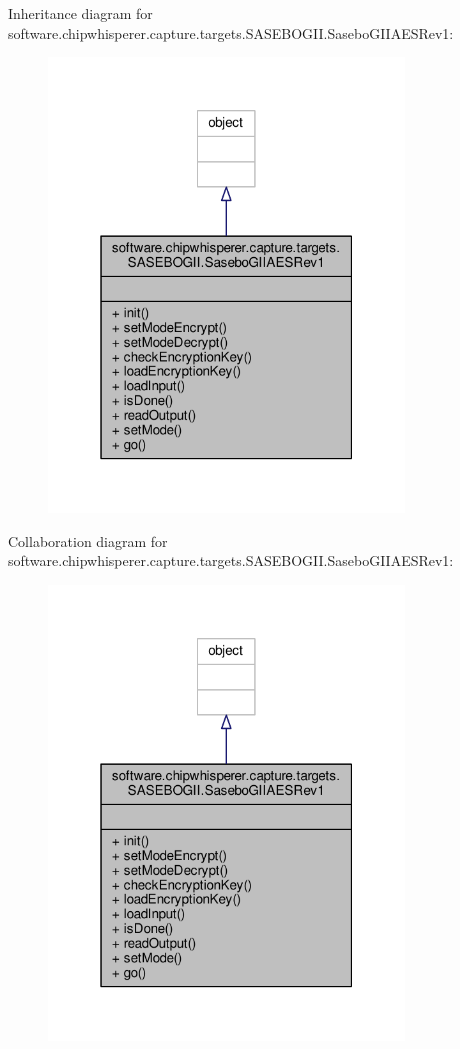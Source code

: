 Inheritance diagram for software.\+chipwhisperer.\+capture.\+targets.\+S\+A\+S\+E\+B\+O\+G\+I\+I.\+Sasebo\+G\+I\+I\+A\+E\+S\+Rev1\+:\nopagebreak
\begin{figure}[H]
\begin{center}
\leavevmode
\includegraphics[width=268pt]{d3/d6c/classsoftware_1_1chipwhisperer_1_1capture_1_1targets_1_1SASEBOGII_1_1SaseboGIIAESRev1__inherit__graph}
\end{center}
\end{figure}


Collaboration diagram for software.\+chipwhisperer.\+capture.\+targets.\+S\+A\+S\+E\+B\+O\+G\+I\+I.\+Sasebo\+G\+I\+I\+A\+E\+S\+Rev1\+:\nopagebreak
\begin{figure}[H]
\begin{center}
\leavevmode
\includegraphics[width=268pt]{d5/d81/classsoftware_1_1chipwhisperer_1_1capture_1_1targets_1_1SASEBOGII_1_1SaseboGIIAESRev1__coll__graph}
\end{center}
\end{figure}


